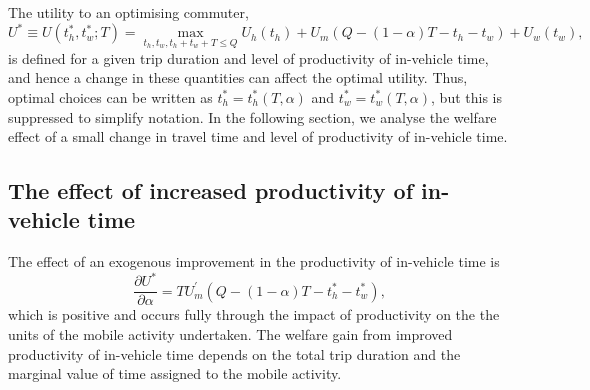 \documentclass[12pt,a4paper,british]{article}
\begin{document}
The utility to an optimising commuter,%
\begin{equation}
U^{\ast}\equiv U\left(t_{h}^{\ast},t_{w}^{\ast};T\right)=\max_{t_{h},t_{w},t_{h}+t_{w}+T\leq Q}U_{h}\left(t_{h}\right)+U_{m}\left(Q-\left(1-\alpha\right)T-t_{h}-t_{w}\right)+U_{w}\left(t_{w}\right),
\label{eq:UStarDet}
\end{equation}
is defined for a given trip duration and level of productivity of in-vehicle time, and hence a change in these quantities can affect the optimal utility. Thus, optimal choices can be written as $t_h^{\ast}= t_h^{\ast} \left(T, \alpha \right)$ and $t_w^{\ast} = t_w^{\ast} \left(T, \alpha \right)$, but this is suppressed to simplify notation. In the following section, we analyse the welfare effect of a small change in travel time and level of productivity of in-vehicle time.


\subsection*{The effect of increased productivity of in-vehicle time}

The effect of an exogenous improvement in the productivity of in-vehicle time is
\begin{equation*}
    \frac{\partial U^{\ast}}{\partial \alpha} = T U^{\prime}_m\left( Q-\left(1-\alpha\right)T-t_{h}^{\ast}-t_{w}^{\ast} \right),
\end{equation*}
which is positive and occurs fully through the impact of productivity on the the units of the mobile activity undertaken. The welfare gain from improved productivity of in-vehicle time depends on the total trip duration and the marginal value of time assigned to the mobile activity. %
\end{document}
